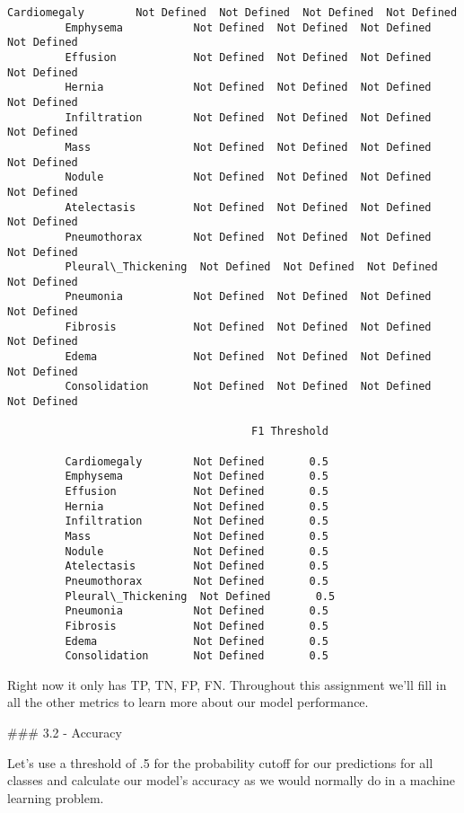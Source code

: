 \documentclass[11pt]{article}
\begin{document}
\begin{Verbatim}[commandchars=\\\{\}]
         Cardiomegaly        Not Defined  Not Defined  Not Defined  Not Defined   
         Emphysema           Not Defined  Not Defined  Not Defined  Not Defined   
         Effusion            Not Defined  Not Defined  Not Defined  Not Defined   
         Hernia              Not Defined  Not Defined  Not Defined  Not Defined   
         Infiltration        Not Defined  Not Defined  Not Defined  Not Defined   
         Mass                Not Defined  Not Defined  Not Defined  Not Defined   
         Nodule              Not Defined  Not Defined  Not Defined  Not Defined   
         Atelectasis         Not Defined  Not Defined  Not Defined  Not Defined   
         Pneumothorax        Not Defined  Not Defined  Not Defined  Not Defined   
         Pleural\_Thickening  Not Defined  Not Defined  Not Defined  Not Defined   
         Pneumonia           Not Defined  Not Defined  Not Defined  Not Defined   
         Fibrosis            Not Defined  Not Defined  Not Defined  Not Defined   
         Edema               Not Defined  Not Defined  Not Defined  Not Defined   
         Consolidation       Not Defined  Not Defined  Not Defined  Not Defined   
         
                                      F1 Threshold  
                                                    
         Cardiomegaly        Not Defined       0.5  
         Emphysema           Not Defined       0.5  
         Effusion            Not Defined       0.5  
         Hernia              Not Defined       0.5  
         Infiltration        Not Defined       0.5  
         Mass                Not Defined       0.5  
         Nodule              Not Defined       0.5  
         Atelectasis         Not Defined       0.5  
         Pneumothorax        Not Defined       0.5  
         Pleural\_Thickening  Not Defined       0.5  
         Pneumonia           Not Defined       0.5  
         Fibrosis            Not Defined       0.5  
         Edema               Not Defined       0.5  
         Consolidation       Not Defined       0.5  
\end{Verbatim}
            
    Right now it only has TP, TN, FP, FN. Throughout this assignment we'll
fill in all the other metrics to learn more about our model performance.

     \#\#\# 3.2 - Accuracy

Let's use a threshold of .5 for the probability cutoff for our
predictions for all classes and calculate our model's accuracy as we
would normally do in a machine learning problem.
\end{document}
